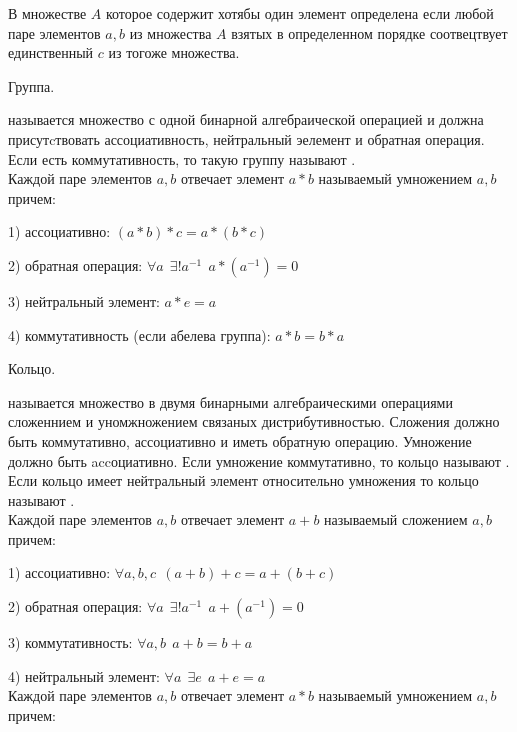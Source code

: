   В множестве $A$ которое содержит хотябы один элемент определена
 если любой паре элементов $a,b$ из множества $A$
взятых в определенном порядке соотвецтвует единственный $c$ из тогоже множества.

\begin{title}[\Large]
  Группа.
\end{title}

   называется множество с одной бинарной алгебраической операцией и
должна присутcтвовать ассоциативность, нейтральный эелемент и обратная операция.
Если есть коммутативность, то такую группу называют .\\

  Каждой паре элементов $a,b$ отвечает элемент $a*b$ называемый умножением $a,b$
причем:

1) ассоциативно: $(a*b)*c = a*(b*c)$

2) обратная операция: $\forall a ~~ \exists ! a^{-1} ~~ a * (a^{-1}) = 0$

3) нейтральный элемент: $a*e = a$

4) коммутативность (если абелева группа): $a*b = b*a$

\begin{title}[\Large]
  Кольцо.
\end{title}

   называется множество в двумя бинарными алгебраическими операциями
сложеннием и уномжножением связаных дистрибутивностью. Сложения должно быть
коммутативно, ассоциативно и иметь обратную операцию. Умножение должно быть
accоциативно. Если умножение коммутативно, то кольцо называют . Если кольцо имеет нейтральный элемент относительно умножения то
кольцо называют .\\

  Каждой паре элементов $a,b$ отвечает элемент $a+b$ называемый сложением $a,b$
причем:

1) ассоциативно: $\forall a,b,c ~~ (a+b)+c = a+(b+c)$

2) обратная операция: $\forall a ~~ \exists ! a^{-1} ~~ a + (a^{-1}) = 0$

3) коммутативность: $\forall a,b ~~ a+b = b+a$

4) нейтральный элемент: $\forall a ~~ \exists e ~~ a+e = a$\\

  Каждой паре элементов $a,b$ отвечает элемент $a*b$ называемый умножением $a,b$
причем:

